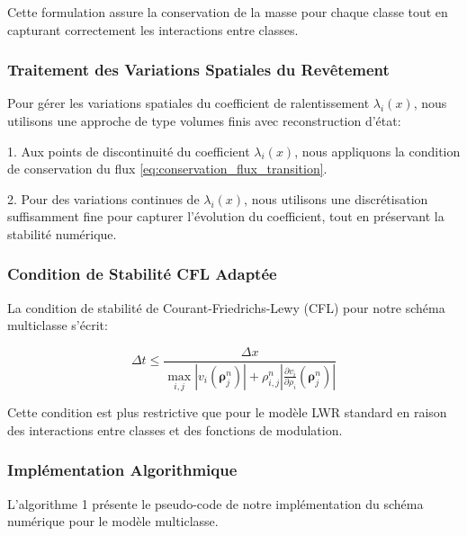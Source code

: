 Cette formulation assure la conservation de la masse pour chaque classe tout en capturant correctement les interactions entre classes.

\subsubsection{Traitement des Variations Spatiales du Revêtement}
\label{subsubsec:traitement_revetement}

Pour gérer les variations spatiales du coefficient de ralentissement $\lambda_i(x)$, nous utilisons une approche de type volumes finis avec reconstruction d'état:

1. Aux points de discontinuité du coefficient $\lambda_i(x)$, nous appliquons la condition de conservation du flux \eqref{eq:conservation_flux_transition}.

2. Pour des variations continues de $\lambda_i(x)$, nous utilisons une discrétisation suffisamment fine pour capturer l'évolution du coefficient, tout en préservant la stabilité numérique.

\subsubsection{Condition de Stabilité CFL Adaptée}
\label{subsubsec:condition_cfl}

La condition de stabilité de Courant-Friedrichs-Lewy (CFL) pour notre schéma multiclasse s'écrit:

\begin{equation}
\Delta t \leq \frac{\Delta x}{\max_{i,j} |v_i(\boldsymbol{\rho}^n_j)| + \rho_{i,j}^n\left|\frac{\partial v_i}{\partial \rho_i}(\boldsymbol{\rho}^n_j)\right|}
\end{equation}

Cette condition est plus restrictive que pour le modèle LWR standard en raison des interactions entre classes et des fonctions de modulation.

\subsubsection{Implémentation Algorithmique}
\label{subsubsec:implementation_algorithmique}

L'algorithme 1 présente le pseudo-code de notre implémentation du schéma numérique pour le modèle multiclasse.

